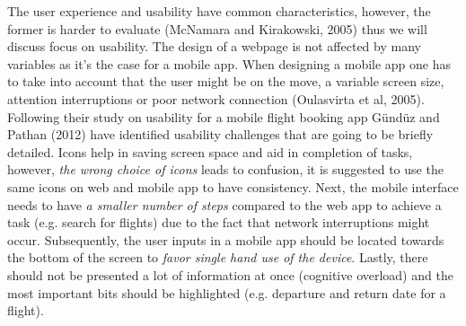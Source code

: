 \documentclass[version=last,fontsize=13pt]{scrartcl}
\begin{document}
The user experience and usability have common characteristics, however, the former is harder to evaluate (McNamara and Kirakowski, 2005) thus we will discuss focus  on usability.
The design of a webpage is not affected by many variables as it's the case for a mobile app. When designing a mobile app one has to take into account that the user might be on the move, a variable screen size, attention interruptions or poor network connection (Oulasvirta et al, 2005). Following their study on usability for a mobile flight booking app Gündüz and Pathan (2012) have identified  usability challenges that are going to be briefly detailed. Icons help in saving screen space and aid in completion of tasks, however, \textit{the wrong choice of icons} leads to confusion, it is suggested to use the same icons on web and mobile app to have consistency. Next, the mobile interface needs  to have \textit{a smaller number of steps} compared to the web app to achieve a task (e.g. search for flights) due to the fact that network interruptions might occur. Subsequently, the user inputs in a mobile app should be located towards the bottom of the screen to \textit{favor single hand use of the device}. Lastly,  there should not be presented a lot of information at once (cognitive overload) and the most important bits should be highlighted (e.g. departure and return date for a flight).
\end{document}
